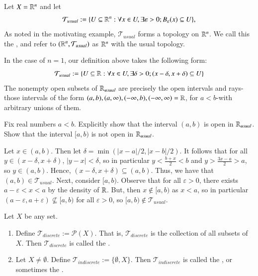 \documentclass[12pt, a4paper, oneside, openright, titlepage]{book}
\begin{document}
\begin{example}
    Let $X = \mathbb R^n$ and let \begin{equation*}
        \mathcal{T}_{usual} := \{U\subseteq \mathbb R^n:\forall x \in U,\exists\varepsilon > 0; B_{\varepsilon}(x) \subseteq U\},
    \end{equation*}
    As noted in the motivating example, $\mathcal{T}_{usual}$ forms a topology on $\mathbb R^n$. We call this the , and refer to $(\mathbb R^n,\mathcal{T}_{usual})$ as $\mathbb R^n$ with the usual topology. 

    In the case of $n = 1$, our definition above takes the following form: \begin{equation*}
        \mathcal{T}_{usual} := \{U \subseteq \mathbb R:\forall x\in U,\exists \delta >0; (x-\delta,x+\delta)\subseteq U\}
    \end{equation*}
    The nonempty open subsets of $\mathbb R_{usual}$ are precisely the open intervals and rays\--those intervals of the form $(a,b), (a,\infty),(-\infty,b), (-\infty,\infty) = \mathbb R$, for $a < b$\--with arbitrary unions of them.
\end{example}

\begin{exercise}
    Fix real numbers $a<b$. Explicitly show that the interval $(a,b)$ is open in $\mathbb R_{usual}$. Show that the interval $[a,b)$ is not open in $\mathbb R_{usual}$.
\end{exercise}
\begin{remark}[Solution]
    Let $x \in (a,b)$. Then let $\delta = \min(|x-a|/2,|x-b|/2)$. It follows that for all $y \in (x-\delta, x+\delta)$, $|y-x| < \delta$, so in particular $y < \frac{b+x}{2} < b$ and $y > \frac{3x-a}{2} > a$, so $y \in (a,b)$. Hence, $(x-\delta,x+\delta) \subseteq (a,b)$. Thus, we have that $(a,b) \in \mathcal{T}_{usual}$. Next, consider $[a,b)$. Observe that for all $\varepsilon > 0$, there exists $a-\varepsilon < x < a$ by the density of $\mathbb R$. But, then $x \notin [a,b)$ as $x < a$, so in particular $(a-\varepsilon,a+\varepsilon) \nsubseteq [a,b)$ for all $\varepsilon > 0$, so $[a,b) \notin \mathcal{T}_{usual}$.
\end{remark}

\begin{example}
    Let $X$ be any set. \begin{enumerate}
        \item Define $\mathcal{T}_{discrete} := \mathcal{P}(X)$. That is, $\mathcal{T}_{discrete}$ is the collection of all subsets of $X$. Then $\mathcal{T}_{discrete}$ is called the .
        \item Let $X \neq \emptyset$. Define $\mathcal{T}_{indiscrete} :=\{\emptyset,X\}$. Then $\mathcal{T}_{indiscrete}$ is called the , or sometimes the .
    \end{enumerate}
\end{example}
\end{document}
